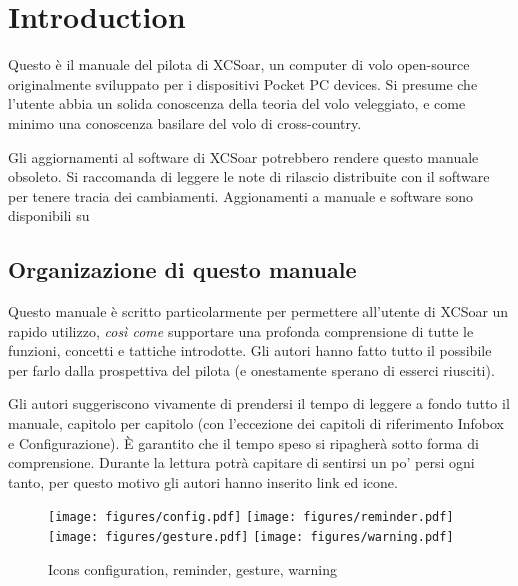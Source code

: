 \chapter{Introduction}\label{cha:introduction}
Questo è il manuale del pilota di XCSoar, un computer di volo open-source
originalmente sviluppato per i dispositivi Pocket PC devices.  Si presume 
che l'utente abbia un solida conoscenza della teoria del volo veleggiato,
e come minimo una conoscenza basilare del volo di cross-country.

Gli aggiornamenti al software di XCSoar potrebbero rendere questo manuale 
obsoleto. Si raccomanda di leggere le note di rilascio distribuite con il 
software per tenere tracia dei cambiamenti.  Aggionamenti a manuale e software
sono disponibili su 
\begin{quote}
\xcsoarwebsite{}
\end{quote}

\section{Organizazione di questo manuale}

Questo manuale è scritto particolarmente per permettere all'utente di XCSoar
un rapido utilizzo, 
  \emph{così come} supportare una profonda comprensione di tutte le funzioni, 
concetti e tattiche introdotte. Gli autori hanno fatto tutto il possibile per 
farlo dalla prospettiva del pilota (e onestamente sperano di esserci riusciti).

Gli autori suggeriscono vivamente di prendersi il tempo di leggere a fondo
tutto il manuale, capitolo per capitolo (con l'eccezione dei capitoli di 
riferimento Infobox e Configurazione). È garantito che il tempo speso si
ripagherà sotto forma di comprensione. Durante la lettura potrà capitare di 
sentirsi un po' persi ogni tanto, per questo motivo gli autori hanno inserito
link ed icone.

\begin{figure}[h]
\centering
\texttt{[image: figures/config.pdf]}
\hspace{1.5cm}
\texttt{[image: figures/reminder.pdf]}
\hspace{1.5cm}
\texttt{[image: figures/gesture.pdf]}
\hspace{1.5cm}
\texttt{[image: figures/warning.pdf]}
\caption{Icons configuration, reminder, gesture, warning}
\end{figure}

